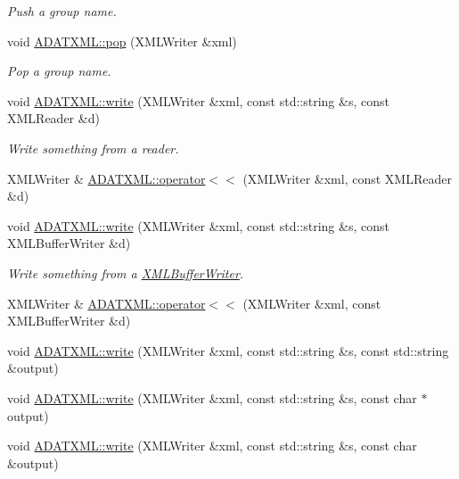 \begin{DoxyCompactItemize}
\begin{DoxyCompactList}\small\item\em Push a group name. \end{DoxyCompactList}\item 
void \mbox{\hyperlink{group__io_gac235f191b977af85918b9a9d063ba5f4}{A\+D\+A\+T\+X\+M\+L\+::pop}} (X\+M\+L\+Writer \&xml)
\begin{DoxyCompactList}\small\item\em Pop a group name. \end{DoxyCompactList}\item 
void \mbox{\hyperlink{group__io_ga0b5b9fff1a99b7e41bb286c7c153ff78}{A\+D\+A\+T\+X\+M\+L\+::write}} (X\+M\+L\+Writer \&xml, const std\+::string \&s, const X\+M\+L\+Reader \&d)
\begin{DoxyCompactList}\small\item\em Write something from a reader. \end{DoxyCompactList}\item 
X\+M\+L\+Writer \& \mbox{\hyperlink{group__io_gaeedb0da293eebaa00dff464efbb18eab}{A\+D\+A\+T\+X\+M\+L\+::operator$<$$<$}} (X\+M\+L\+Writer \&xml, const X\+M\+L\+Reader \&d)
\item 
void \mbox{\hyperlink{group__io_ga14c568a7a3ffb3e486c9036ff7382f8e}{A\+D\+A\+T\+X\+M\+L\+::write}} (X\+M\+L\+Writer \&xml, const std\+::string \&s, const X\+M\+L\+Buffer\+Writer \&d)
\begin{DoxyCompactList}\small\item\em Write something from a \mbox{\hyperlink{classADATXML_1_1XMLBufferWriter}{X\+M\+L\+Buffer\+Writer}}. \end{DoxyCompactList}\item 
X\+M\+L\+Writer \& \mbox{\hyperlink{group__io_ga5f6c03929b05296b731cf36fb65cf9c6}{A\+D\+A\+T\+X\+M\+L\+::operator$<$$<$}} (X\+M\+L\+Writer \&xml, const X\+M\+L\+Buffer\+Writer \&d)
\item 
void \mbox{\hyperlink{group__io_ga20a076b653822e9476b7712de61b383c}{A\+D\+A\+T\+X\+M\+L\+::write}} (X\+M\+L\+Writer \&xml, const std\+::string \&s, const std\+::string \&output)
\item 
void \mbox{\hyperlink{group__io_gafaebe3bd91fd5654568bc862bded8d3d}{A\+D\+A\+T\+X\+M\+L\+::write}} (X\+M\+L\+Writer \&xml, const std\+::string \&s, const char $\ast$output)
\item 
void \mbox{\hyperlink{group__io_ga397db53ca185f22405c43c5b5f6e6a8d}{A\+D\+A\+T\+X\+M\+L\+::write}} (X\+M\+L\+Writer \&xml, const std\+::string \&s, const char \&output)

\end{DoxyCompactItemize}

